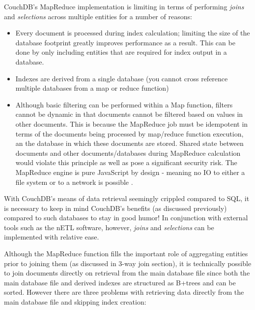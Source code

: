 \label{chapter-analysis}
CouchDB's MapReduce implementation is limiting in terms of performing \textit{joins} and \textit{selections} across multiple entities for a number of reasons:

\begin{itemize}
    \item Every document is processed during index calculation; limiting the size of the database footprint greatly improves performance as a result. This can be done by only including entities that are required for index output in a database.
    \item Indexes are derived from a single database (you cannot cross reference multiple databases from a map or reduce function)
    \item Although basic filtering can be performed within a Map function, filters cannot be dynamic in that documents cannot be filtered based on values in other documents. This is because the MapReduce job must be idempotent in terms of the documents being processed by map/reduce function execution, an the database in which these documents are stored. Shared state between documents and other documents/databases during MapReduce calculation would violate this principle as well as pose a significant security risk. The MapReduce engine is pure JavaScript by design - meaning no IO to either a file system or to a network is possible \cite{slack28Feb}.
\end{itemize}

With CouchDB's means of data retrieval seemingly crippled compared to SQL, it is necessary to keep in mind CouchDB's benefits (as discussed previously) compared to such databases to stay in good humor! In conjunction with external tools such as the nETL software, however, \textit{joins} and \textit{selections} can be implemented with relative ease.

Although the MapReduce function fills the important role of aggregating entities prior to joining them (as discussed in 3-way join section), it is technically possible to join documents directly on retrieval from the main database file since both the main database file and derived indexes are structured as B+trees and can be sorted. However there are three problems with retrieving data directly from the main database file and skipping index creation:

